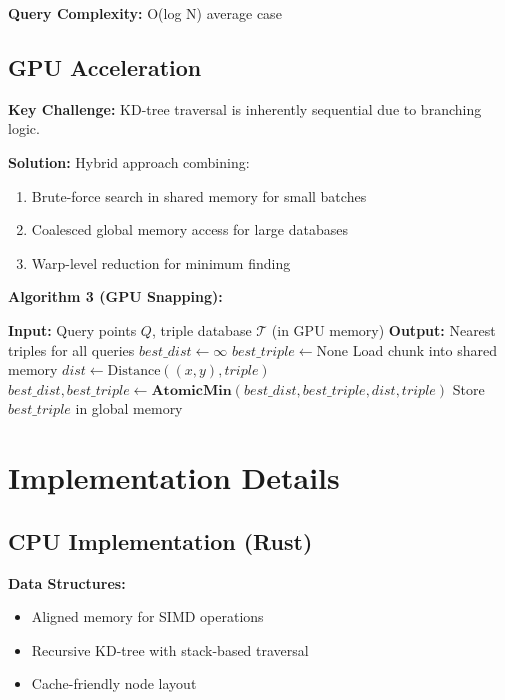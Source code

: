 \documentclass{article}
\begin{document}
\textbf{Query Complexity:} O(log N) average case

\subsection{GPU Acceleration}

\textbf{Key Challenge:} KD-tree traversal is inherently sequential due to branching logic.

\textbf{Solution:} Hybrid approach combining:
\begin{enumerate}
    \item Brute-force search in shared memory for small batches
    \item Coalesced global memory access for large databases
    \item Warp-level reduction for minimum finding
\end{enumerate}

\textbf{Algorithm 3 (GPU Snapping):}
\begin{algorithmic}[1]
\State \textbf{Input:} Query points $Q$, triple database $\mathcal{T}$ (in GPU memory)
\State \textbf{Output:} Nearest triples for all queries
    \State $best\_dist \leftarrow \infty$
    \State $best\_triple \leftarrow \text{None}$
        \State Load chunk into shared memory
            \State $dist \leftarrow \text{Distance}((x, y), triple)$
            \State $best\_dist, best\_triple \leftarrow \textbf{AtomicMin}(best\_dist, best\_triple, dist, triple)$
        \EndFor
    \EndFor
    \State Store $best\_triple$ in global memory
\EndFor
\end{algorithmic}

\section{Implementation Details}

\subsection{CPU Implementation (Rust)}

\textbf{Data Structures:}
\begin{itemize}
    \item Aligned memory for SIMD operations
    \item Recursive KD-tree with stack-based traversal
    \item Cache-friendly node layout
\end{itemize}
\end{document}
